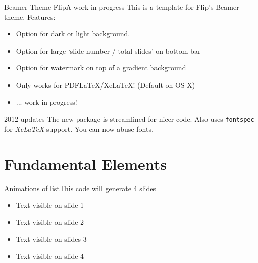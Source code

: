 \begin{frame}[c]{Beamer Theme Flip}{A work in progress}
	This is a template for Flip's Beamer theme. Features:
	\begin{itemize}
		\item Option for dark or light background. 
		\\ 
		\normalsize
		\item Option for large `slide number / total slides' on bottom bar\\
		\item Option for watermark on top of a gradient background
		\item Only works for PDFLaTeX/XeLaTeX! (Default on OS X)
		\item ... work in progress! 
	\end{itemize}
	
	\begin{block}{2012 updates}
		The new package is streamlined for nicer code. Also uses \texttt{fontspec} for \textit{XeLaTeX} support. You can now abuse fonts.
	\end{block}
	
\end{frame}

\section{Fundamental Elements}

\begin{frame}[c]{Animations of list}{This code will generate 4 slides}
	
	\begin{itemize}
		\item<1-> Text visible on slide 1
		\item<2-> Text visible on slide 2
		\item<3> Text visible on slides 3
		\item<4-> Text visible on slide 4
	\end{itemize}
\end{frame}

